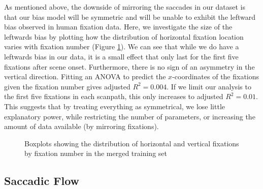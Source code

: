 As mentioned above, the downside of mirroring the saccades in our dataset is that our bias model will be symmetric and will be unable to exhibit the leftward bias observed in human fixation data. Here, we investigate the size of the leftwards bias by plotting how the distribution of horizontal fixation location varies with fixation number (Figure \ref{fig:leftrightDist}). We can see that while we do have a leftwards bias in our data, it is a small effect that only last for the first five fixations after scene onset. Furthermore, there is no sign of an asymmetry in the vertical direction. Fitting an ANOVA to predict the $x$-coordinates of the fixations given the fixation number gives adjusted $R^2=0.004$. If we limit our analysis to the first five fixations in each scanpath, this only increases to adjusted $R^2=0.01$. This suggests that by treating everything as symmetrical, we lose little explanatory power, while restricting the number of parameters, or increasing the amount of data available (by mirroring fixations). 

\begin{figure}
\centering
{}
\caption{Boxplots showing the distribution of horizontal and vertical fixations by fixation number in the merged training set}
\label{fig:leftrightDist}
\end{figure}


\subsection{Saccadic Flow}
\label{ModellingFlow}

